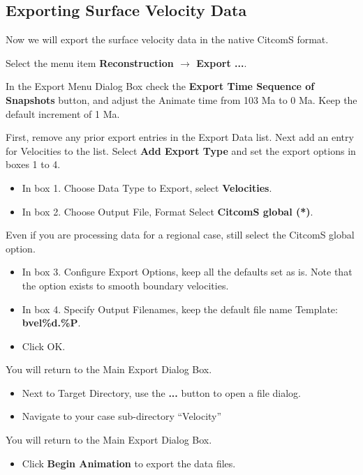 \documentclass[letterpaper,12pt]{article}
\newcommand{\gp}[1]{\textbf{#1}}
\begin{document}
\subsection{Exporting Surface Velocity Data}
\label{ssect:GPlates_output_2}

Now we will export the surface velocity data in the native CitcomS format.

Select the menu item \gp{Reconstruction $\rightarrow$ Export ...}.

In the Export Menu Dialog Box check the \gp{Export Time Sequence of Snapshots} button, 
and adjust the Animate time from 103 Ma to 0 Ma.  Keep the default increment of 1 Ma.

First, remove any prior export entries in the Export Data list.
Next add an entry for Velocities to the list.
Select \gp{Add Export Type} and set the export options in boxes 1 to 4.

\begin{itemize}
\item In box 1. Choose Data Type to Export, select \gp{Velocities}.
\item In box 2. Choose Output File, Format Select \gp{CitcomS global (*)}.
\end{itemize}

Even if you are processing data for a regional case, still select the CitcomS global option.

\begin{itemize}
\item In box 3. Configure Export Options, keep all the defaults set as is. Note that the option exists to smooth boundary velocities.
\item In box 4. Specify Output Filenames, keep the default file name Template: \gp{bvel\%d.\%P}.
\item Click OK.
\end{itemize}

You will return to the Main Export Dialog Box.

\begin{itemize}
\item Next to Target Directory, use the \gp{...} button to open a file dialog.
\item Navigate to your case sub-directory ``Velocity''
\end{itemize}

You will return to the Main Export Dialog Box.

\begin{itemize}
\item Click \gp{Begin Animation} to export the data files.
\end{itemize}
\end{document}
